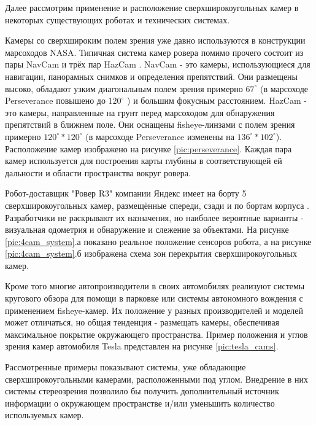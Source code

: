 
Далее рассмотрим применение и расположение сверхширокоугольных камер в некоторых существующих роботах и 
технических системах.

Камеры со сверхшироким полем зрения уже давно используются в конструкции марсоходов NASA. Типичная система 
камер ровера помимо прочего состоит из пары NavCam и трёх пар HazCam \cite{opportunity}. NavCam - это камеры, использующиеся для навигации,
 панорамных снимков и определения препятствий. Они размещены высоко, обладают узким диагональным полем зрения примерно $67^\circ$ (в марсоходе 
Perseverance повышено до $120^\circ$ \cite{perseverance}) и большим фокусным расстоянием. HazCam - это камеры, направленные на грунт перед марсоходом для обнаружения 
 препятствий в ближнем поле. Они оснащены fisheye-линзами с полем зрения примерно $120^\circ * 120^\circ$ (в марсоходе Perseverance изменены на $136^\circ * 102^\circ$).
Расположение камер изображено на рисунке \ref{pic:perseverance}. Каждая пара камер используется для построения карты глубины в соответствующей ей дальности 
и области пространства вокруг ровера. 


Робот-доставщик "Ровер R3"  компании Яндекс имеет на борту 5 сверхширокоугольных камер, 
размещённые спереди, сзади и по бортам корпуса \cite{yandex_rover}. Разработчики не раскрывают их назначения, но наиболее 
вероятные варианты - визуальная одометрия и обнаружение и слежение за объектами. %
На рисунке \ref{pic:4cam_system}.а показано реальное положение сенсоров робота, а на рисунке \ref{pic:4cam_system}.б 
изображена схема зон перекрытия сверхширокоугольных камер. 

 
Кроме того многие автопроизводители в своих автомобилях реализуют системы кругового обзора для помощи в парковке или 
системы автономного вождения с применением fisheye-камер. Их положение у разных производителей и моделей может отличаться, 
но общая тенденция - размещать камеры, обеспечивая максимальное покрытие окружающего пространства. Пример положения и 
углов зрения камер автомобиля Tesla представлен на рисунке \ref{pic:tesla_cams}. 


Рассмотренные примеры показывают системы, уже обладающие сверхширокоугольными камерами, расположенными под углом. Внедрение 
в них системы стереозрения позволило бы получить дополнительный источник информации о окружающем пространстве и/или уменьшить 
количество используемых камер. 